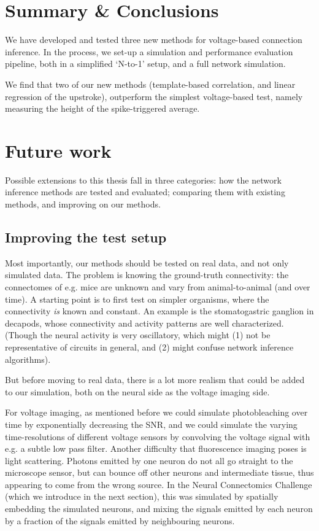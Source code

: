 
\section{Summary \& Conclusions}

We have developed and tested three new methods for voltage-based connection inference.
In the process, we set-up a simulation and performance evaluation pipeline, both in a simplified `N-to-1' setup, and a full network simulation.

We find that two of our new methods (template-based correlation, and linear regression of the upstroke), outperform the simplest voltage-based test, namely measuring the height of the spike-triggered average.



\section{Future work}


Possible extensions to this thesis fall in three categories: how the network inference methods are tested and evaluated; comparing them with existing methods, and improving on our methods.


\subsection{Improving the test setup}

Most importantly, our methods should be tested on real data, and not only simulated data. The problem is knowing the ground-truth connectivity: the connectomes of e.g. mice are unknown and vary from animal-to-animal (and over time).
A starting point is to first test on simpler organisms, where the connectivity \emph{is} known and constant. An example is the stomatogastric ganglion in decapods, whose connectivity and activity patterns are well characterized. (Though the neural activity is very oscillatory, which might (1) not be representative of circuits in general, and (2) might confuse network inference algorithms).

But before moving to real data, there is a lot more realism that could be added to our simulation, both on the neural side as the voltage imaging side.

For voltage imaging, as mentioned before we could simulate photobleaching over time by exponentially decreasing the SNR, and we could simulate the varying time-resolutions of different voltage sensors by convolving the voltage signal with e.g. a subtle low pass filter.
Another difficulty that fluorescence imaging poses is light scattering. Photons emitted by one neuron do not all go straight to the microscope sensor, but can bounce off other neurons and intermediate tissue, thus appearing to come from the wrong source. In the  Neural Connectomics Challenge (which we introduce in the next section), this was simulated by spatially embedding the simulated neurons, and mixing the signals emitted by each neuron by a fraction of the signals emitted by neighbouring neurons.

